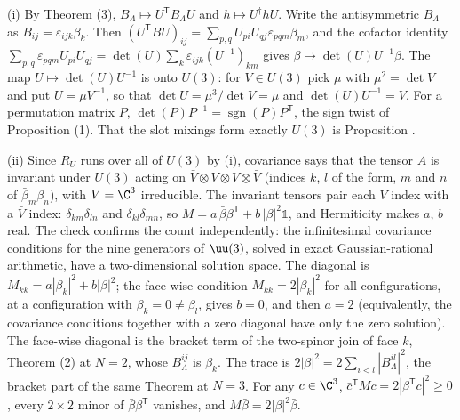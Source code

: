 (i) By Theorem (3), $B_{\Lambda} \mapsto U^{\mathsf T}B_{\Lambda}U$ and $h \mapsto U^{\dagger}hU$. Write the antisymmetric $B_{\Lambda}$ as $B_{ij} = \varepsilon_{ijk}\beta_{k}$. Then $(U^{\mathsf T}BU)_{ij} = \sum_{p,q}U_{pi}U_{qj}\varepsilon_{pqm}\beta_{m}$, and the cofactor identity $\sum_{p,q}\varepsilon_{pqm}U_{pi}U_{qj} = \det(U)\sum_{k}\varepsilon_{ijk}(U^{-1})_{km}$ gives $\beta \mapsto \det(U)U^{-1}\beta$. The map $U \mapsto \det(U)U^{-1}$ is onto $U(3)$: for $V \in U(3)$ pick $\mu$ with $\mu^{2} = \det V$ and put $U = \mu V^{-1}$, so that $\det U = \mu^{3}/\det V = \mu$ and $\det(U)U^{-1} = V$. For a permutation matrix $P$, $\det(P)P^{-1} = \operatorname{sgn}(P)P^{\mathsf T}$, the sign twist of Proposition (1). That the slot mixings form exactly $U(3)$ is Proposition .

(ii) Since $R_{U}$ runs over all of $U(3)$ by (i), covariance says that the tensor $A$ is invariant under $U(3)$ acting on $\bar V \otimes V \otimes V \otimes \bar V$ (indices $k$, $l$ of the form, $m$ and $n$ of $\bar\beta_{m}\beta_{n}$), with $V = \C^{3}$ irreducible. The invariant tensors pair each $V$ index with a $\bar V$ index: $\delta_{km}\delta_{ln}$ and $\delta_{kl}\delta_{mn}$, so $M = a\,\bar\beta\beta^{\mathsf T} + b\,|\beta|^{2}\mathbb{1}$, and Hermiticity makes $a$, $b$ real. The check confirms the count independently: the infinitesimal covariance conditions for the nine generators of $\uu(3)$, solved in exact Gaussian-rational arithmetic, have a two-dimensional solution space. The diagonal is $M_{kk} = a|\beta_{k}|^{2} + b|\beta|^{2}$; the face-wise condition $M_{kk} = 2|\beta_{k}|^{2}$ for all configurations, at a configuration with $\beta_{k} = 0 \neq \beta_{l}$, gives $b = 0$, and then $a = 2$ (equivalently, the covariance conditions together with a zero diagonal have only the zero solution). The face-wise diagonal is the bracket term of the two-spinor join of face $k$, Theorem (2) at $N = 2$, whose $B^{ij}_{\Lambda}$ is $\beta_{k}$. The trace is $2|\beta|^{2} = 2\sum_{i<l}|B^{il}_{\Lambda}|^{2}$, the bracket part of the same Theorem at $N = 3$. For any $c \in \C^{3}$, $\bar c^{\mathsf T}M c = 2|\beta^{\mathsf T}c|^{2} \ge 0$, every $2 \times 2$ minor of $\bar\beta\beta^{\mathsf T}$ vanishes, and $M\bar\beta = 2|\beta|^{2}\bar\beta$.

